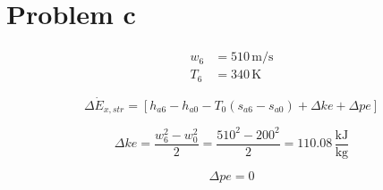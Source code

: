 \section*{Problem c}

\begin{align*}
    w_6 &= 510 \, \text{m/s} \\
    T_6 &= 340 \, \text{K}
\end{align*}

\[
\Delta \dot{E}_{x,str} = \left[ h_{a6} - h_{a0} - T_0 \left( s_{a6} - s_{a0} \right) + \Delta ke + \Delta pe \right]
\]

\[
\Delta ke = \frac{w_6^2 - w_0^2}{2} = \frac{510^2 - 200^2}{2} = 110.08 \, \frac{\text{kJ}}{\text{kg}}
\]

\[
\Delta pe = 0
\]
